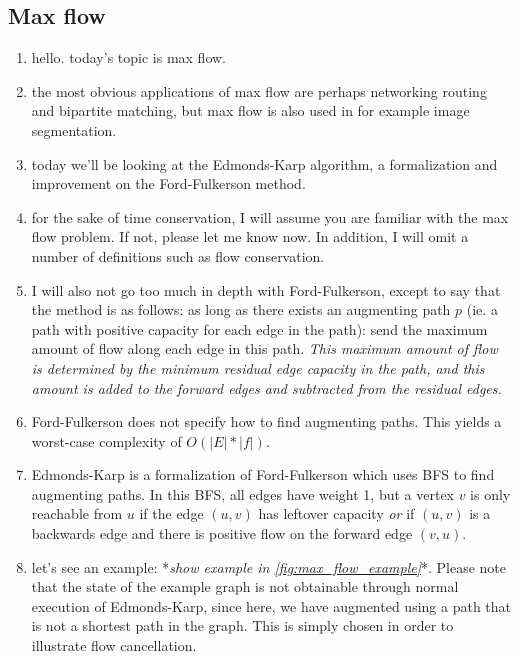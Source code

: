 \subsection{Max flow}

\begin{enumerate}

  \item hello. today's topic is max flow.

  \item the most obvious applications of max flow are perhaps networking routing
    and bipartite matching, but max flow is also used in for example image
    segmentation.

  \item today we'll be looking at the Edmonds-Karp algorithm, a formalization
    and improvement on the Ford-Fulkerson method.

  \item for the sake of time conservation, I will assume you are familiar with
    the max flow problem. If not, please let me know now. In addition, I will
    omit a number of definitions such as flow conservation.

  \item I will also not go too much in depth with Ford-Fulkerson, except to say
    that the method is as follows: as long as there exists an augmenting path
    $p$ (ie. a path with positive capacity for each edge in the path): send the
    maximum amount of flow along each edge in this path. \emph{This maximum
    amount of flow is determined by the minimum residual edge capacity in the
    path, and this amount is added to the forward edges and subtracted from the
    residual edges.}

  \item Ford-Fulkerson does not specify how to find augmenting paths. This
    yields a worst-case complexity of $O(|E| * |f|)$.

  \item Edmonds-Karp is a formalization of Ford-Fulkerson which uses BFS to find
    augmenting paths. In this BFS, all edges have weight 1, but a vertex $v$
    is only reachable from $u$ if the edge $(u, v)$ has leftover capacity
    \emph{or} if $(u, v)$ is a backwards edge and there is positive flow on the
    forward edge $(v, u)$.

  \item let's see an example: *\emph{show example in
    \cref{fig:max_flow_example}}*. Please note that the state of the example
    graph is not obtainable through normal execution of Edmonds-Karp, since
    here, we have augmented using a path that is not a shortest path in the
    graph. This is simply chosen in order to illustrate flow cancellation.


\end{enumerate}
